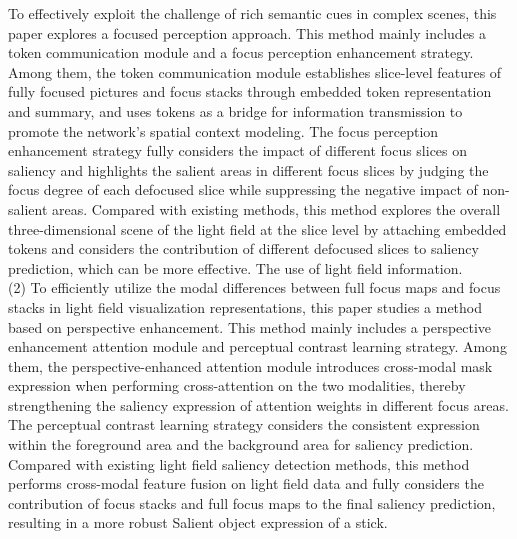 \begin{englishabstract}
To effectively exploit the challenge of rich semantic cues in complex scenes, this paper explores a focused perception approach. This method mainly includes a token communication module and a focus perception enhancement strategy. Among them, the token communication module establishes slice-level features of fully focused pictures and focus stacks through embedded token representation and summary, and uses tokens as a bridge for information transmission to promote the network's spatial context modeling. The focus perception enhancement strategy fully considers the impact of different focus slices on saliency and highlights the salient areas in different focus slices by judging the focus degree of each defocused slice while suppressing the negative impact of non-salient areas. Compared with existing methods, this method explores the overall three-dimensional scene of the light field at the slice level by attaching embedded tokens and considers the contribution of different defocused slices to saliency prediction, which can be more effective. The use of light field information.
\\
%
%
%
%
\indent
(2)
%
%
To efficiently utilize the modal differences between full focus maps and focus stacks in light field visualization representations, this paper studies a method based on perspective enhancement. This method mainly includes a perspective enhancement attention module and perceptual contrast learning strategy. Among them, the perspective-enhanced attention module introduces cross-modal mask expression when performing cross-attention on the two modalities, thereby strengthening the saliency expression of attention weights in different focus areas. The perceptual contrast learning strategy considers the consistent expression within the foreground area and the background area for saliency prediction. Compared with existing light field saliency detection methods, this method performs cross-modal feature fusion on light field data and fully considers the contribution of focus stacks and full focus maps to the final saliency prediction, resulting in a more robust Salient object expression of a stick.






\end{englishabstract}
